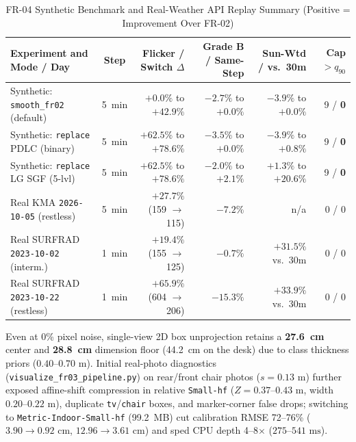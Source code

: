 \documentclass[conference]{IEEEtran}
\begin{document}
\begin{table}[t]
\caption{FR-04 Synthetic Benchmark and Real-Weather API Replay Summary (Positive = Improvement Over FR-02)}
\label{tab:fr04_eval}
\centering
\footnotesize
\setlength{\tabcolsep}{4.5pt}
\renewcommand{\arraystretch}{1.10}
\begin{tabular}{@{}lcrrrr@{}}
\toprule
\textbf{Experiment and Mode / Day} & \textbf{Step} & \textbf{Flicker / Switch $\Delta$} & \textbf{Grade B / Same-Step} & \textbf{Sun-Wtd / vs.\ 30m} & \textbf{Cap $> q_{90}$} \\
\midrule
Synthetic: \texttt{smooth\_fr02} (default) & 5~min & $+0.0\%$ to $\mathbf{+42.9\%}$ & $-2.7\%$ to $+0.0\%$ & $-3.9\%$ to $+0.0\%$ & 9 / \textbf{0} \\
Synthetic: \texttt{replace} PDLC (binary) & 5~min & $+62.5\%$ to $\mathbf{+78.6\%}$ & $-3.5\%$ to $+0.0\%$ & $-3.9\%$ to $+0.8\%$ & 9 / \textbf{0} \\
Synthetic: \texttt{replace} LG SGF (5-lvl) & 5~min & $+62.5\%$ to $\mathbf{+78.6\%}$ & $-2.0\%$ to $+2.1\%$ & $\mathbf{+1.3\%}$ to $\mathbf{+20.6\%}$ & 9 / \textbf{0} \\
\midrule
Real KMA \texttt{2026-10-05} (restless) & 5~min & $\mathbf{+27.7\%}$ (159 $\to$ 115) & $-7.2\%$ & n/a & 0 / 0 \\
Real SURFRAD \texttt{2023-10-02} (interm.) & 1~min & $\mathbf{+19.4\%}$ (155 $\to$ 125) & $-0.7\%$ & $\mathbf{+31.5\%}$ vs.\ 30m & 0 / 0 \\
Real SURFRAD \texttt{2023-10-22} (restless) & 1~min & $\mathbf{+65.9\%}$ (604 $\to$ 206) & $-15.3\%$ & $\mathbf{+33.9\%}$ vs.\ 30m & 0 / 0 \\
\bottomrule
\end{tabular}
\end{table}

Even at 0\% pixel noise, single-view 2D box unprojection retains a \textbf{27.6~cm} center and \textbf{28.8~cm} dimension floor (44.2~cm on the desk) due to class thickness priors ($0.40$--$0.70\text{ m}$). Initial real-photo diagnostics (\texttt{visualize\_fr03\_pipeline.py}) on rear/front chair photos ($s=0.13\text{ m}$) further exposed affine-shift compression in relative \texttt{Small-hf} ($Z=0.37$--$0.43\text{ m}$, width $0.20$--$0.22\text{ m}$), duplicate \texttt{tv}/\texttt{chair} boxes, and marker-corner false drops; switching to \texttt{Metric-Indoor-Small-hf} (99.2~MB) cut calibration RMSE 72--76\% ($3.90\to 0.92\text{ cm}$, $12.96\to 3.61\text{ cm}$) and sped CPU depth 4--8$\times$ ($275$--$541\text{ ms}$).
\end{document}
